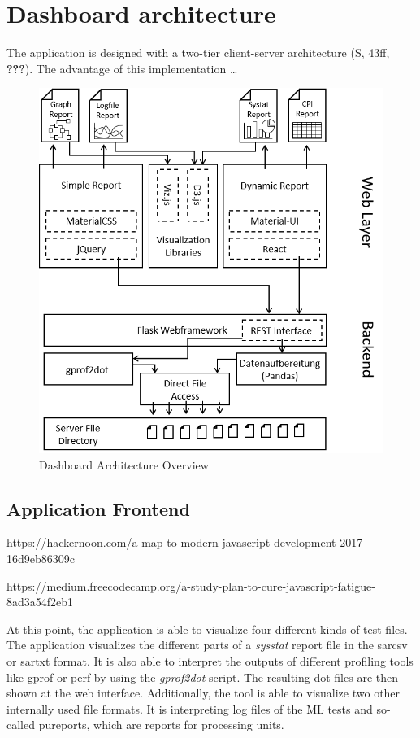\documentclass[american,a4paper,oneside,,tablecaptionabove]{scrbook}
\begin{document}
\section{Dashboard architecture}\label{dashboard-architecture}

The application is designed with a two-tier client-server architecture
(S, 43ff, {\textbf{???}}). The advantage of this implementation \ldots{}

\begin{figure}
\centering
\includegraphics{./tex2pdf.19444/06fc6364987d51a2618f7bbaf6ec1533acca6cc2.png}
\caption{Dashboard Architecture Overview}
\end{figure}

\subsection{Application Frontend}\label{application-frontend}

https://hackernoon.com/a-map-to-modern-javascript-development-2017-16d9eb86309c

https://medium.freecodecamp.org/a-study-plan-to-cure-javascript-fatigue-8ad3a54f2eb1

At this point, the application is able to visualize four different kinds
of test files. The application visualizes the different parts of a
\emph{sysstat} report file in the sarcsv or sartxt format. It is also
able to interpret the outputs of different profiling tools like gprof or
perf by using the \emph{gprof2dot} script. The resulting dot files are
then shown at the web interface. Additionally, the tool is able to
visualize two other internally used file formats. It is interpreting log
files of the ML tests and so-called pureports, which are reports for
processing units.
\end{document}
